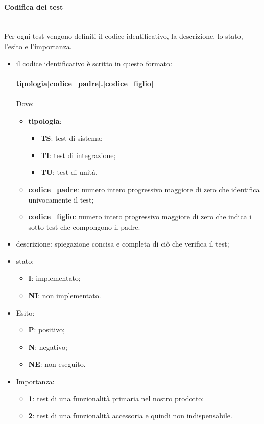 \paragraph*{Codifica dei test} \mbox{} \\ [1mm]
Per ogni test vengono definiti il codice identificativo, la descrizione, lo stato, l'esito e l'importanza.
\begin{itemize}
	\item il codice identificativo è scritto in questo formato:\\
	\\ \textbf{tipologia[codice\_padre].[codice\_figlio]} \\
	\\ Dove:
	\begin{itemize}
		\item \textbf{tipologia}:
		\begin{itemize}
			\item \textbf{TS}: test di sistema;
			\item \textbf{TI}: test di integrazione;
			\item \textbf{TU}: test di unità.
		\end{itemize}
		\item \textbf{codice\_padre}: numero intero progressivo maggiore di zero che identifica univocamente il test;
		\item \textbf{codice\_figlio}: numero intero progressivo maggiore di zero che indica i sotto-test che compongono il padre.
	\end{itemize}
	\item descrizione: spiegazione concisa e completa di ciò che verifica il test;
	\item stato:
	\begin{itemize}
		\item \textbf{I}: implementato;
		\item \textbf{NI}: non implementato.
	\end{itemize}
	\item Esito:
	\begin{itemize}
		\item \textbf{P}: positivo;
		\item \textbf{N}: negativo;
		\item \textbf{NE}: non eseguito.
	\end{itemize}
	\item Importanza:
	\begin{itemize}
		\item \textbf{1}: test di una funzionalità primaria nel nostro prodotto;
		\item \textbf{2}: test di una funzionalità accessoria e quindi non indispensabile.
	\end{itemize}
\end{itemize}

